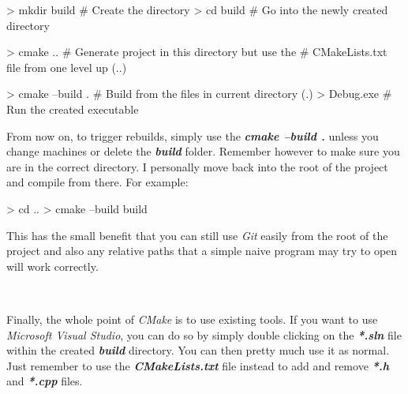 \documentclass[10pt]{article}
\begin{document}
\begin{Code}
  > mkdir build     # Create the directory
  > cd build        # Go into the newly created directory

  > cmake ..        # Generate project in this directory but use the
                    # CMakeLists.txt file from one level up (..)

  > cmake --build . # Build from the files in current directory (.)
  > Debug\game.exe  # Run the created executable
\end{Code}

From now on, to trigger rebuilds, simply use the
\textbf{\textit{cmake --build .}} unless you change machines or delete
the \textbf{\textit{build}} folder.  Remember however to make sure you
are in the correct directory. I personally move back into the root of
the project and compile from there. For example:

\begin{Code}
  > cd ..
  > cmake --build build
\end{Code}

This has the small benefit that you can still use \textit{Git} easily
from the root of the project and also any relative paths that a simple
naive program may try to open will work correctly.

\

Finally, the whole point of \textit{CMake} is to use existing
tools. If you want to use \textit{Microsoft Visual Studio}, you
can do so by simply double clicking on the \textbf{\textit{*.sln}}
file within the created \textbf{\textit{build}} directory. You
can then pretty much use it as normal. Just remember to use the
\textbf{\textit{CMakeLists.txt}} file instead to add and remove
\textbf{\textit{*.h}} and \textbf{\textit{*.cpp}} files.


\end{document}

